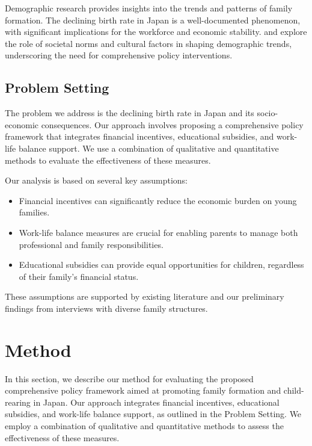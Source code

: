 \documentclass{article} %
\begin{document}
Demographic research provides insights into the trends and patterns of family formation. The declining birth rate in Japan is a well-documented phenomenon, with significant implications for the workforce and economic stability. \citet{park2023generative} and \citet{shanahan2023role} explore the role of societal norms and cultural factors in shaping demographic trends, underscoring the need for comprehensive policy interventions.

\subsection{Problem Setting}
\label{sec:problem_setting}

The problem we address is the declining birth rate in Japan and its socio-economic consequences. Our approach involves proposing a comprehensive policy framework that integrates financial incentives, educational subsidies, and work-life balance support. We use a combination of qualitative and quantitative methods to evaluate the effectiveness of these measures.

Our analysis is based on several key assumptions:
\begin{itemize}
    \item Financial incentives can significantly reduce the economic burden on young families.
    \item Work-life balance measures are crucial for enabling parents to manage both professional and family responsibilities.
    \item Educational subsidies can provide equal opportunities for children, regardless of their family's financial status.
\end{itemize}
These assumptions are supported by existing literature and our preliminary findings from interviews with diverse family structures.

\section{Method}
\label{sec:method}

In this section, we describe our method for evaluating the proposed comprehensive policy framework aimed at promoting family formation and child-rearing in Japan. Our approach integrates financial incentives, educational subsidies, and work-life balance support, as outlined in the Problem Setting. We employ a combination of qualitative and quantitative methods to assess the effectiveness of these measures.
\end{document}
